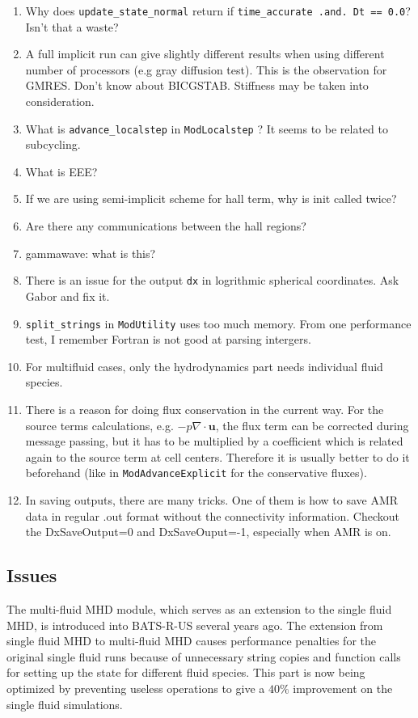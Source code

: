 \documentclass[11pt]{book} %
\begin{document}
\begin{enumerate}
\item Why does \verb|update_state_normal| return if \verb|time_accurate .and. Dt == 0.0|? Isn't that a waste?
\item A full implicit run can give slightly different results when using different number of processors (e.g gray diffusion test). This is the observation for GMRES. Don't know about BICGSTAB. Stiffness may be taken into consideration.
\item What is \verb|advance_localstep| in \verb|ModLocalstep| ? It seems to be related to subcycling.
\item What is EEE?
\item If we are using semi-implicit scheme for hall term, why is init called twice?
\item Are there any communications between the hall regions?
\item gammawave: what is this?
\item There is an issue for the output \verb|dx| in logrithmic spherical coordinates. Ask Gabor and fix it.
\item \verb|split_strings| in \verb|ModUtility| uses too much memory. From one performance test, I remember Fortran is not good at parsing intergers.
\item For multifluid cases, only the hydrodynamics part needs individual fluid species.
\item There is a reason for doing flux conservation in the current way. For the source terms calculations, e.g. $-p\nabla\cdot\mathbf{u}$, the flux term can be corrected during message passing, but it has to be multiplied by a coefficient which is related again to the source term at cell centers. Therefore it is usually better to do it beforehand (like in \verb|ModAdvanceExplicit| for the conservative fluxes).
\item In saving outputs, there are many tricks. One of them is how to save AMR data in regular .out format without the connectivity information. Checkout the DxSaveOutput=0 and DxSaveOuput=-1, especially when AMR is on.
\end{enumerate}

\subsection{Issues}


The multi-fluid MHD module, which serves as an extension to the single fluid MHD, is introduced into BATS-R-US several years ago. The extension from single fluid MHD to multi-fluid MHD causes performance penalties for the original single fluid runs because of unnecessary string copies and function calls for setting up the state for different fluid species. This part is now being optimized by preventing useless operations to give a $40\%$ improvement on the single fluid simulations.
\end{document}
